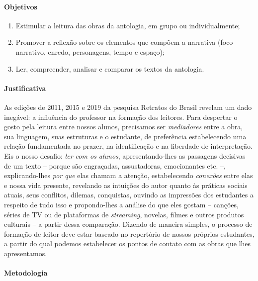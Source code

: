 \documentclass{extarticle}
\begin{document}
\paragraph{Objetivos} 

\begin{enumerate}
\item Estimular a leitura das obras da antologia, em grupo ou individualmente; 
\item Promover a reflexão sobre os elementos que compõem a narrativa
(foco narrativo, enredo, personagens, tempo e espaço); 
\item Ler, compreender, analisar e comparar os textos da antologia.
\end{enumerate}

\paragraph{Justificativa} As edições de 2011, 2015 e 2019 da pesquisa
Retratos do Brasil revelam um dado inegável: a influência do professor
na formação dos leitores. Para despertar o gosto pela leitura entre
nossos alunos, precisamos ser \emph{mediadores} entre a obra, sua
linguagem, suas estruturas e o estudante, de preferência estabelecendo
uma relação fundamentada no prazer, na identificação e na liberdade de
interpretação. Eis o nosso desafio: \emph{ler com os alunos},
apresentando-lhes as passagens decisivas de um texto -- porque são
engraçadas, assustadoras, emocionantes etc. --, explicando-lhes
\emph{por que} elas chamam a atenção, estabelecendo \emph{conexões}
entre elas e nossa vida presente, revelando as intuições do autor quanto
às práticas sociais atuais, seus conflitos, dilemas, conquistas, ouvindo
as impressões dos estudantes a respeito de tudo isso e propondo-lhes a
análise do que eles gostam -- canções, séries de TV ou de plataformas de
\emph{streaming}, novelas, filmes e outros produtos culturais -- a
partir dessa comparação. Dizendo de maneira simples, o processo de
formação de leitor deve estar baseado no repertório de nossos próprios
estudantes, a partir do qual podemos estabelecer os pontos de contato
com as obras que lhes apresentamos.

\paragraph{Metodologia}
\end{document}
